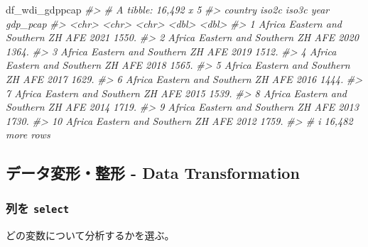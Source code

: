 \documentclass[
  xelatex, ja=standard]{bxjsbook}
\newenvironment{Shaded}{\begin{snugshade}}{\end{snugshade}}
\newcommand{\CommentTok}[1]{\textcolor[rgb]{0.56,0.35,0.01}{\textit{#1}}}
\newcommand{\NormalTok}[1]{#1}
\theoremstyle{definition}
\theoremstyle{definition}
\theoremstyle{definition}
\theoremstyle{definition}
\theoremstyle{remark}
\begin{document}
\begin{Shaded}
\begin{Highlighting}[]
\NormalTok{df\_wdi\_gdppcap}
\CommentTok{\#\textgreater{} \# A tibble: 16,492 x 5}
\CommentTok{\#\textgreater{}    country                     iso2c iso3c  year gdp\_pcap}
\CommentTok{\#\textgreater{}    \textless{}chr\textgreater{}                       \textless{}chr\textgreater{} \textless{}chr\textgreater{} \textless{}dbl\textgreater{}    \textless{}dbl\textgreater{}}
\CommentTok{\#\textgreater{}  1 Africa Eastern and Southern ZH    AFE    2021    1550.}
\CommentTok{\#\textgreater{}  2 Africa Eastern and Southern ZH    AFE    2020    1364.}
\CommentTok{\#\textgreater{}  3 Africa Eastern and Southern ZH    AFE    2019    1512.}
\CommentTok{\#\textgreater{}  4 Africa Eastern and Southern ZH    AFE    2018    1565.}
\CommentTok{\#\textgreater{}  5 Africa Eastern and Southern ZH    AFE    2017    1629.}
\CommentTok{\#\textgreater{}  6 Africa Eastern and Southern ZH    AFE    2016    1444.}
\CommentTok{\#\textgreater{}  7 Africa Eastern and Southern ZH    AFE    2015    1539.}
\CommentTok{\#\textgreater{}  8 Africa Eastern and Southern ZH    AFE    2014    1719.}
\CommentTok{\#\textgreater{}  9 Africa Eastern and Southern ZH    AFE    2013    1730.}
\CommentTok{\#\textgreater{} 10 Africa Eastern and Southern ZH    AFE    2012    1759.}
\CommentTok{\#\textgreater{} \# i 16,482 more rows}
\end{Highlighting}
\end{Shaded}

\hypertarget{ux30c7ux30fcux30bfux5909ux5f62ux6574ux5f62---data-transformation}{%
\subsection{データ変形・整形 - Data Transformation}\label{ux30c7ux30fcux30bfux5909ux5f62ux6574ux5f62---data-transformation}}

\hypertarget{ux5217ux3092-select}{%
\subsubsection{\texorpdfstring{列を \texttt{select}}{列を select}}\label{ux5217ux3092-select}}

どの変数について分析するかを選ぶ。
\end{document}
